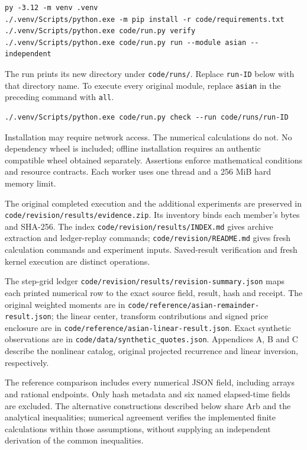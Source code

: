 \begin{verbatim}
py -3.12 -m venv .venv
./.venv/Scripts/python.exe -m pip install -r code/requirements.txt
./.venv/Scripts/python.exe code/run.py verify
./.venv/Scripts/python.exe code/run.py run --module asian --independent
\end{verbatim}

The run prints its new directory under \texttt{code/runs/}. Replace
\texttt{run-ID} below with that directory name. To execute every original module,
replace \texttt{asian} in the preceding command with \texttt{all}.

\begin{verbatim}
./.venv/Scripts/python.exe code/run.py check --run code/runs/run-ID
\end{verbatim}

Installation may require network access. The numerical calculations do not.
No dependency wheel is included; offline installation requires an authentic
compatible wheel obtained separately. Assertions enforce mathematical conditions
and resource contracts. Each worker uses one thread and a 256 MiB hard memory limit.

The original completed execution and the additional experiments are preserved in
\texttt{code/revision/results/evidence.zip}. Its inventory binds each member's
bytes and SHA-256. The index \texttt{code/revision/results/INDEX.md} gives archive
extraction and ledger-replay commands; \texttt{code/revision/README.md} gives fresh
calculation commands and experiment inputs. Saved-result verification and fresh
kernel execution are distinct operations.

The step-grid ledger
\texttt{code/revision/results/revision-summary.json} maps each printed numerical
row to the exact source field, result, hash and receipt. The original weighted
moments are in \texttt{code/reference/asian-remainder-result.json}; the linear
center, transform contributions and signed price enclosure are in
\texttt{code/reference/asian-linear-result.json}. Exact synthetic observations are
in \texttt{code/data/synthetic\_quotes.json}. Appendices A, B and C describe the
nonlinear catalog, original projected recurrence and linear inversion, respectively.

The reference comparison includes every numerical JSON field, including arrays
and rational endpoints. Only hash metadata and six named elapsed-time fields are
excluded. The alternative constructions described below share
Arb and the analytical inequalities; numerical agreement verifies the implemented
finite calculations within those assumptions, without supplying an independent
derivation of the common inequalities.

